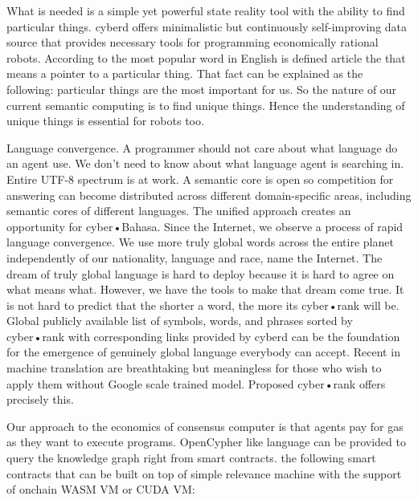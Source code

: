 \documentclass[8pt,oneside]{amsart}
\newcommand{\linkgreen}[2]{\href{#1}{\color{green}{#2}}}
\newcommand{\code}[1]{{\PlayBold #1}}
\begin{document}
What is needed is a simple yet powerful state reality tool with the ability to find particular things. \code{cyberd} offers minimalistic but continuously self-improving data source that provides necessary tools for programming economically rational robots. According to \linkgreen{https://github.com/first20hours/google-10000-english}{top-10000 english words} the most popular word in English is defined article \code{the} that means a pointer to a particular thing. That fact can be explained as the following: particular things are the most important for us. So the nature of our current semantic computing is to find unique things. Hence the understanding of unique things is essential for robots too.

\code{Language convergence}. A programmer should not care about what language do an agent use. We don't need to know about what language agent is searching in. Entire UTF-8 spectrum is at work. A semantic core is open so competition for answering can become distributed across different domain-specific areas, including semantic cores of different languages. The unified approach creates an opportunity for cyber•Bahasa. Since the Internet, we observe a process of rapid language convergence. We use more truly global words across the entire planet independently of our nationality, language and race, name the Internet. The dream of truly global language is hard to deploy because it is hard to agree on what means what. However, we have the tools to make that dream come true. It is not hard to predict that the shorter a word, the more its cyber•rank will be. Global publicly available list of symbols, words, and phrases sorted by cyber•rank with corresponding links provided by cyberd can be the foundation for the emergence of genuinely global language everybody can accept. Recent \linkgreen{https://ipfs.io/ipfs/QmQUWBhDMfPKgFt3NfbxM1VU22oU8CRepUzGPBDtopwap1}{scientific advances} in machine translation are breathtaking but meaningless for those who wish to apply them without Google scale trained model. Proposed cyber•rank offers precisely this.

Our approach to the economics of consensus computer is that agents pay for gas as they want to execute programs. OpenCypher like language can be provided to query the knowledge graph right from smart contracts. \linkgreen{https://medium.com/@karpathy/software-2-0-a64152b37c35}{We can envision} the following smart contracts that can be built on top of simple relevance machine with the support of onchain WASM VM or CUDA VM:
\end{document}
